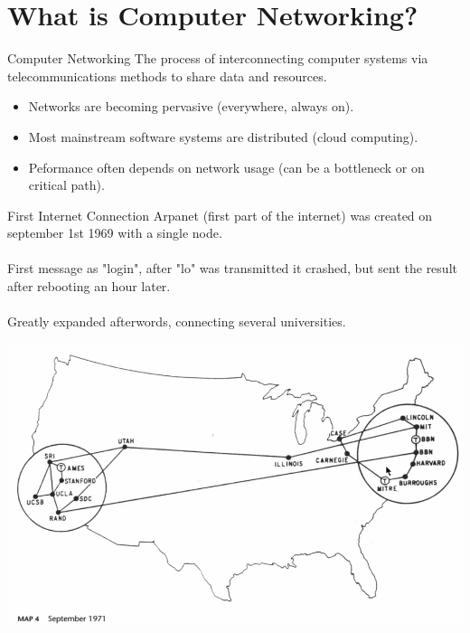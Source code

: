 \section{What is Computer Networking?}
\begin{definitionbox}{Computer Networking}
    The process of interconnecting computer systems via telecommunications methods to share data and resources.
\end{definitionbox}

\begin{itemize}
    \setlength\itemsep{0em}
    \item Networks are becoming pervasive (everywhere, always on).
    \item Most mainstream software systems are distributed (cloud computing).
    \item Peformance often depends on network usage (can be a bottleneck or on critical path).
\end{itemize}

\begin{sidenotebox}{First Internet Connection}
    Arpanet (first part of the internet) was created on september 1st 1969 with a single node.
    \\
    \\ First message as "login", after "lo" was transmitted it crashed, but sent the result after rebooting an hour later.
    \\
    \\ Greatly expanded afterwords, connecting several universities.
    \begin{center}
        \includegraphics[width=\textwidth]{introduction/images/arpanet_sept_1971.png}
    \end{center}
\end{sidenotebox}

